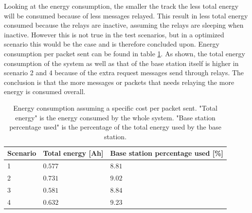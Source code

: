 \noindent Looking at the energy consumption, the smaller the track the less total energy will be consumed because of less messages relayed. This result in less total energy consumed because the relays are inactive, assuming the relays are sleeping when inactive. However this is not true in the test scenarios, but in a optimized scenario this would be the case and is therefore concluded upon. Energy consumption per packet sent can be found in table \ref{table:energyConsumption}. As shown, the total energy consumption of the system as well as that of the base station itself is higher in scenario 2 and 4 because of the extra request messages send through relays. The conclusion is that the more messages or packets that needs relaying the more energy is consumed overall.

\begin{table}[H]
	\centering
	\begin{tabularx}{\linewidth}{|X|X|X|}
		\hline
		Scenario	& Total energy [Ah]	& Base station percentage used [\%]	\\ \hline
		1			& $0.577$			& $8.81$							\\ \hline
		2			& $0.731$			& $9.02$							\\ \hline
		3			& $0.581$			& $8.84$							\\ \hline
		4			& $0.632$			& $9.23$							\\ \hline
	\end{tabularx}
	\caption{Energy consumption assuming a specific cost per packet sent. "Total energy" is the energy consumed by the whole system. "Base station percentage used" is the percentage of the total energy used by the base station.}
	\label{table:energyConsumption}
\end{table}
